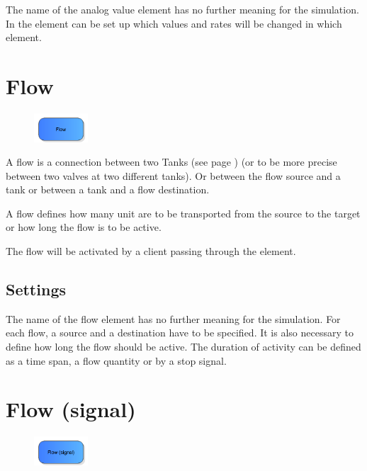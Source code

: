 The name of the analog value element has no further meaning for the simulation.
In the element can be set up which values and rates will be changed in which element.


\section{Flow}
\label{ref:ModelElementTankFlowByClient}

\begin{figure}
\vspace{-22pt}
\includegraphics[width=2cm]{imageModelElementTankFlowByClient.png}
\vspace{-22pt}
\end{figure}

A flow is a connection between two Tanks (see page \pageref{ref:ModelElementTank}) 
(or to be more precise between two valves at two different tanks).
Or between the flow source and a tank or between a tank and a flow destination.

A flow defines how many unit are to be transported from the source to the target
or how long the flow is to be active.

The flow will be activated by a client passing through the element.

\subsection*{Settings}

The name of the flow element has no further meaning for the simulation.
For each flow, a source and a destination have to be specified.
It is also necessary to define how long the flow should be active.
The duration of activity can be defined as a time span, a flow quantity or by a stop signal.


\section{Flow (signal)}
\label{ref:ModelElementTankFlowBySignal}

\begin{figure}
\vspace{-22pt}
\includegraphics[width=2cm]{imageModelElementTankFlowBySignal.png}
\vspace{-22pt}
\end{figure}

